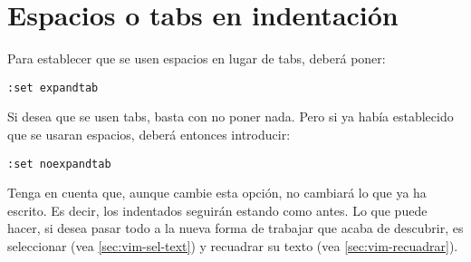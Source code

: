 \section{Espacios o tabs en indentación}\label{sec:vim-esp-indent}
Para establecer que se usen espacios en lugar de tabs, deberá poner:

\begin{lstlisting}[gobble=2,style=bashinteract,escapechar=!]
  :set expandtab
\end{lstlisting}

Si desea que se usen tabs, basta con no poner nada. Pero si ya había establecido que se usaran espacios, deberá
entonces introducir:

\begin{lstlisting}[gobble=2,style=bashinteract,escapechar=!]
  :set noexpandtab
\end{lstlisting}

Tenga en cuenta que, aunque cambie esta opción, no cambiará lo que ya ha escrito. Es decir, los indentados
seguirán estando como antes. Lo que puede hacer, si desea pasar todo a la nueva forma de trabajar que acaba de
descubrir, es seleccionar (vea \ref{sec:vim-sel-text}) y recuadrar su texto (vea \ref{sec:vim-recuadrar}).
